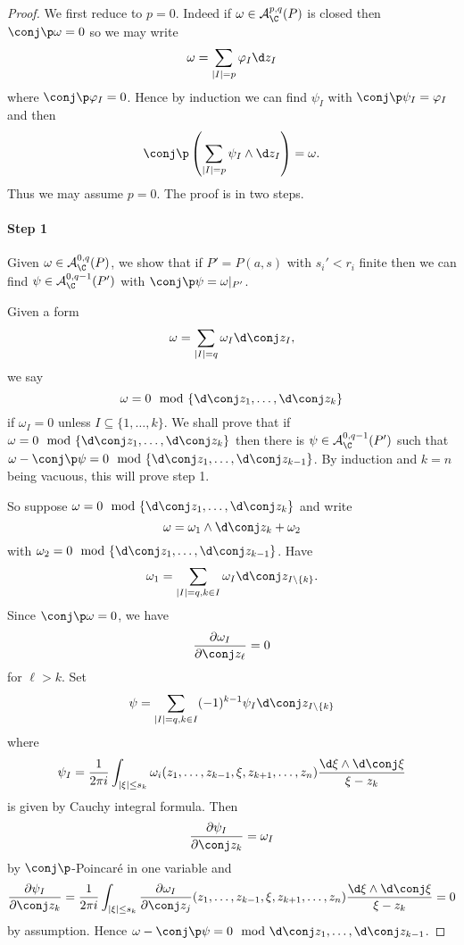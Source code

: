 \documentclass[a4paper]{article}
\newcommand{\w}{\wedge} %
\begin{document}
\begin{proof}
  We first reduce to \(p = 0\). Indeed if \(\omega \in \mathcal A_\C^{p, q}(P)\) is closed then \(\conj \p \omega = 0\) so we may write
  \[
    \omega = \sum_{|I| = p} \varphi_I \d z_I
  \]
  where \(\conj \p \varphi_I = 0\). Hence by induction we can find \(\psi_I\) with \(\conj \p \psi_I = \varphi_I\) and then
  \[
    \conj \p \left(\sum_{|I| = p} \psi_I \w \d z_I\right) = \omega.
  \]
  Thus we may assume \(p = 0\). The proof is in two steps.

  \paragraph{Step 1}

  Given \(\omega \in \mathcal A_\C^{0, q}(P)\), we show that if \(P' = P(a, s)\) with \(s_i' < r_i\) finite then we can find \(\psi \in \mathcal A_\C^{0, q - 1}(P')\) with \(\conj \p \psi = \omega|_{P'}\).

  Given a form
  \[
    \omega = \sum_{|I| = q} \omega_I \d  \conj z_I,
  \]
  we say
  \[
    \omega = 0 \mod \{\d \conj z_1, \dots, \d \conj z_k\}
  \]
  if \(\omega_I = 0\) unless \(I \subseteq \{1, \dots, k\}\). We shall prove that if \(\omega = 0 \mod \{\d \conj z_1, \dots, \d \conj z_k\}\) then there is \(\psi \in \mathcal A_\C^{0, q - 1}(P')\) such that \(\omega - \conj \p \psi = 0 \mod \{\d \conj z_1, \dots, \d \conj z_{k - 1}\}\). By induction and \(k = n\) being vacuous, this will prove step 1.

  So suppose \(\omega = 0 \mod \{\d \conj z_1, \dots, \d \conj z_k\}\) and write
  \[
    \omega = \omega_1 \w \d \conj z_k + \omega_2
  \]
  with \(\omega_2 = 0 \mod \{\d \conj z_1, \dots, \d \conj z_{k - 1}\}\). Have
  \[
    \omega_1 = \sum_{|I| = q, k \in I} \omega_I \d  \conj z_{I \setminus \{k\}}.
  \]
  Since \(\conj \p \omega = 0\), we have
  \[
    \frac{\partial \omega_I}{\partial \conj z_\ell} = 0
  \]
  for \(\ell > k\). Set
  \[
    \psi = \sum_{|I| = q, k \in I} (-1)^{k - 1} \psi_I \d \conj z_{I \setminus \{k\}}
  \]
  where
  \[
    \psi_I = \frac{1}{2\pi i} \int_{|\xi| \leq s_k} \omega_i(z_1, \dots, z_{k - 1}, \xi, z_{k + 1}, \dots, z_n) \frac{\d  \xi \w \d  \conj \xi}{\xi - z_k}
  \]
  is given by Cauchy integral formula. Then
  \[
    \frac{\partial \psi_I}{\partial \conj z_k} = \omega_I
  \]
  by \(\conj \p\)-Poincaré in one variable and
 \[
   \frac{\partial \psi_I}{\partial \conj z_k} = \frac{1}{2\pi i} \int_{|\xi| \leq s_k} \frac{\partial \omega_I}{\partial \conj z_j} (z_1, \dots, z_{k - 1}, \xi, z_{k + 1}, \dots, z_n) \frac{\d  \xi \w \d  \conj \xi}{\xi - z_k}
   = 0
 \]
 by assumption. Hence \(\omega - \conj \p \psi = 0 \mod \d \conj z_1, \dots, \d \conj z_{k - 1}\).
  

\end{proof}
\end{document}
